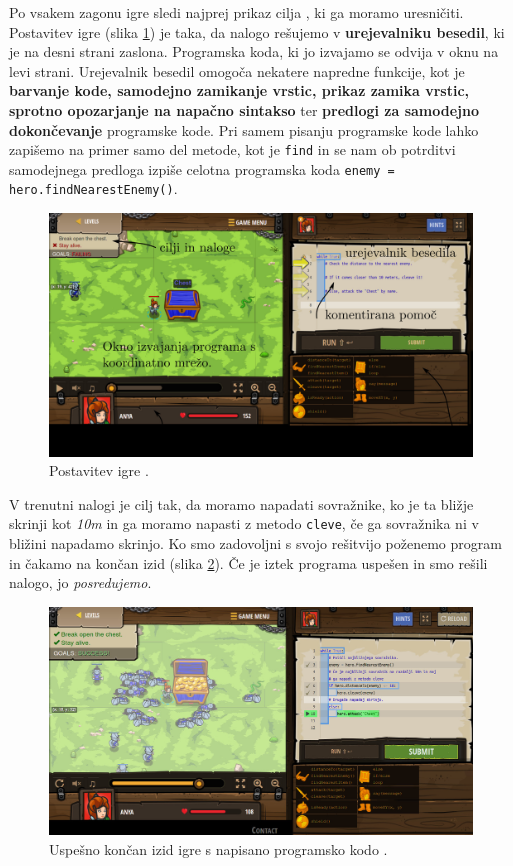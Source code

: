 Po vsakem zagonu igre sledi najprej prikaz cilja , ki ga moramo
uresničiti. Postavitev igre (slika \ref{fig:web:cc:ingame:game}) je
taka, da nalogo rešujemo v \textbf{urejevalniku besedil}, ki je na
desni strani zaslona. Programska koda, ki jo izvajamo se odvija v oknu
na levi strani. Urejevalnik besedil omogoča nekatere napredne
funkcije, kot je \textbf{barvanje kode, samodejno zamikanje vrstic,
  prikaz zamika vrstic, sprotno opozarjanje na napačno sintakso} ter
\textbf{predlogi za samodejno dokončevanje} programske kode. Pri samem
pisanju programske kode lahko zapišemo na primer samo del metode, kot
je \texttt{find} in se nam ob potrditvi samodejnega predloga izpiše
celotna programska koda \texttt{enemy = hero.findNearestEnemy()}.

\begin{figure}[h!]
  \centering
    \includegraphics [width=0.55\linewidth, keepaspectratio =
   1] {./images/sc_web/cc_ingame-game-v01.jpg}
   \caption{Postavitev igre \cite{web:codecombat}.}
   \label{fig:web:cc:ingame:game}
 \end{figure}

 V trenutni nalogi je cilj tak, da moramo napadati sovražnike, ko je
 ta bližje skrinji kot \emph{10m} in ga moramo napasti z metodo
 \texttt{cleve}, če ga sovražnika ni v bližini napadamo skrinjo. Ko
 smo zadovoljni s svojo rešitvijo poženemo program in čakamo na končan
 izid (slika \ref{fig:web:cc:ingame:game2}). Če je iztek programa
 uspešen in smo rešili nalogo, jo \emph{posredujemo}.

\begin{figure}[h!]
  \centering
    \includegraphics [width=0.55\linewidth, keepaspectratio =
   1] {./images/sc_web/cc_ingame-game-v02.jpg}
   \caption{Uspešno končan izid igre s napisano programsko
     kodo \cite{web:codecombat}.}
   \label{fig:web:cc:ingame:game2}
 \end{figure}
 
